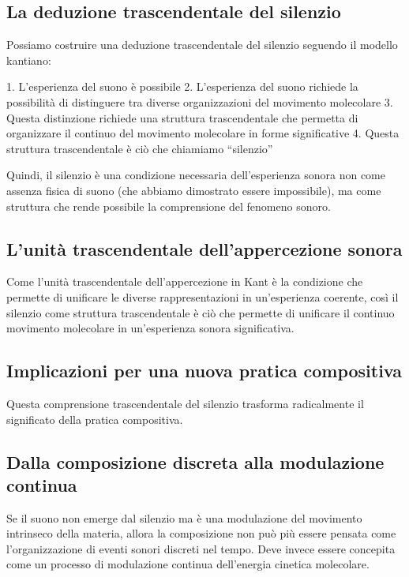 \documentclass{gs-adonis}
\begin{document}
\subsection{La deduzione trascendentale del
silenzio}\label{la-deduzione-trascendentale-del-silenzio}

Possiamo costruire una deduzione trascendentale del silenzio seguendo il
modello kantiano:

1. L'esperienza del suono è possibile 2. L'esperienza del suono richiede
la possibilità di distinguere tra diverse organizzazioni del movimento
molecolare 3. Questa distinzione richiede una struttura trascendentale
che permetta di organizzare il continuo del movimento molecolare in
forme significative 4. Questa struttura trascendentale è ciò che
chiamiamo ``silenzio''

Quindi, il silenzio è una condizione necessaria dell'esperienza sonora
non come assenza fisica di suono (che abbiamo dimostrato essere
impossibile), ma come struttura che rende possibile la comprensione del
fenomeno sonoro.

\subsection{L'unità trascendentale dell'appercezione
sonora}\label{lunituxe0-trascendentale-dellappercezione-sonora}

Come l'unità trascendentale dell'appercezione in Kant è la condizione
che permette di unificare le diverse rappresentazioni in un'esperienza
coerente, così il silenzio come struttura trascendentale è ciò che
permette di unificare il continuo movimento molecolare in un'esperienza
sonora significativa.

\subsection{Implicazioni per una nuova pratica
compositiva}\label{implicazioni-per-una-nuova-pratica-compositiva}

Questa comprensione trascendentale del silenzio trasforma radicalmente
il significato della pratica compositiva.

\subsection{Dalla composizione discreta alla modulazione
continua}\label{dalla-composizione-discreta-alla-modulazione-continua}

Se il suono non emerge dal silenzio ma è una modulazione del movimento
intrinseco della materia, allora la composizione non può più essere
pensata come l'organizzazione di eventi sonori discreti nel tempo. Deve
invece essere concepita come un processo di modulazione continua
dell'energia cinetica molecolare.
\end{document}
